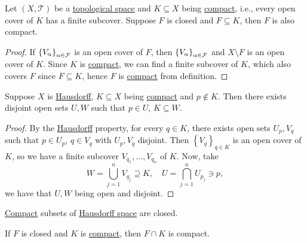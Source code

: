 \begin{theorem}
	Let \((X, \mathcal{T})\) be a \hyperref[def:topological-space]{topological space} and \(K \subseteq X\) being \hyperref[def:compact]{compact}, i.e., every open cover of \(K\) has a finite subcover. Suppose \(F\) is closed and \(F \subseteq K\), then \(F\) is also compact.
\end{theorem}
\begin{proof}
	If \(\left\{ V_\alpha \right\}_{\alpha \in \mathcal{\MakeUppercase{f}} } \) is an open cover of \(F\), then \(\left\{ V_\alpha  \right\}_{\alpha \in \mathcal{\MakeUppercase{f}} } \) and \(X\setminus F\) is an open cover of \(K\). Since \(K\) is \hyperref[def:compact]{compact}, we can find a finite subcover of \(K\), which also covers \(F\) since \(F \subseteq K\), hence \(F\) is \hyperref[def:compact]{compact} from definition.
\end{proof}

\begin{theorem}
	Suppose \(X\) is \hyperref[def:Hausdorff]{Hausdorff}, \(K \subseteq X\) being \hyperref[def:compact]{compact} and \(p \notin K\). Then there exists disjoint open sets \(U, W\) such that \(p\in U\), \(K \subseteq W\).
\end{theorem}
\begin{proof}
	By the \hyperref[def:Hausdorff]{Hausdorff} property, for every \(q\in K\), there exists open sets \(U_p, V_q\) such that \(p\in U_p\), \(q\in V_q\) with \(U_p, V_q\) disjoint. Then \(\left\{ V_q \right\} _{q\in K}\) is an open cover of \(K\), so we have a finite subcover \(V_{q_1}, \ldots  , V_{q_n}\) of \(K\). Now, take
	\[
		W = \bigcup_{j=1}^{n} V_{q_j} \supseteq K,\quad
		U = \bigcap_{j=1}^{n} U_{p_j} \ni p,
	\]
	we have that \(U, W\) being open and disjoint.
\end{proof}

\begin{corollary}
	\hyperref[def:compact]{Compact} subsets of \hyperref[def:Hausdorff]{Hausdorff space} are closed.
\end{corollary}

\begin{corollary}
	If \(F\) is closed and \(K\) is \hyperref[def:compact]{compact}, then \(F \cap K\) is compact.
\end{corollary}

